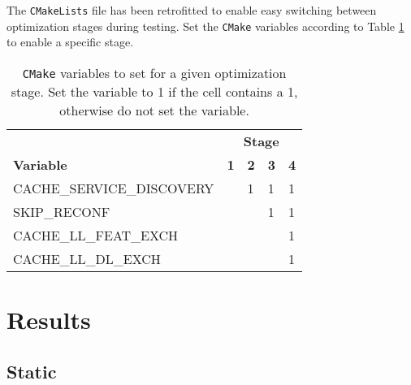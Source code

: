 The \texttt{CMakeLists} file has been retrofitted to enable easy switching between optimization stages during testing. Set the \texttt{CMake} variables according to Table \ref{tbl:stage_defs} to enable a specific stage.
\begin{table}
    \begin{center}
    \begin{tabular}{|l|l|l|l|l|}
        \hline
                                & \multicolumn{4}{c|}{\textbf{Stage}}   \\
        \textbf{Variable}    & \textbf{1} & \textbf{2} & \textbf{3} & \textbf{4} \\
        \hline
        CACHE\_SERVICE\_DISCOVERY &   & 1 & 1 & 1 \\
        \hline
        SKIP\_RECONF             &   &   & 1 & 1 \\
        \hline
        CACHE\_LL\_FEAT\_EXCH      &   &   &   & 1 \\
        \hline
        CACHE\_LL\_DL\_EXCH        &   &   &   & 1 \\
        \hline
    \end{tabular}
    \end{center}
    \caption{\texttt{CMake} variables to set for a given optimization stage. Set the variable to 1 if the cell contains a 1, otherwise do not set the variable.}
    \label{tbl:stage_defs}
\end{table}

\section{Results}
\label{sec:evaluation_results}

\subsection{Static}
\label{sec:static_evaluation}


